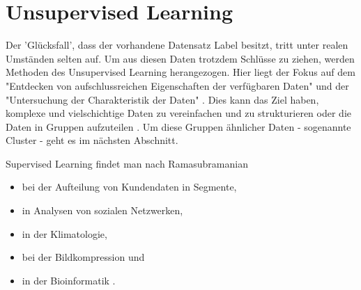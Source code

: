 \section{Unsupervised Learning}\label{sec:us1}
Der 'Glücksfall', dass der vorhandene Datensatz Label besitzt, tritt unter realen Umständen selten auf. Um aus diesen Daten trotzdem Schlüsse zu ziehen, werden Methoden des Unsupervised Learning herangezogen. Hier liegt der Fokus auf dem "Entdecken von aufschlussreichen Eigenschaften der verfügbaren Daten" \citep[S.277; eigene Übersetzung]{kubat_introduction_2017} und der "Untersuchung der Charakteristik der Daten" \citep[S.~13; eigene Übersetzung]{kim_matlab_2017}. Dies kann das Ziel haben, komplexe und vielschichtige Daten zu vereinfachen und zu strukturieren \citep{ericson_how_2017} oder die Daten in Gruppen aufzuteilen \citep[S.~22]{lison_introduction_2012}. Um diese Gruppen ähnlicher Daten - sogenannte Cluster - geht es im nächsten Abschnitt.\par
Supervised Learning findet man nach Ramasubramanian \citep[S.~223]{ramasubramanian_machine_2017}
\begin{itemize}
\item bei der Aufteilung von Kundendaten in Segmente,
\item in Analysen von sozialen Netzwerken,
\item in der Klimatologie,
\item bei der Bildkompression und
\item in der Bioinformatik \citep[S.~6]{kauchak_neural_2016}.
\end{itemize}

